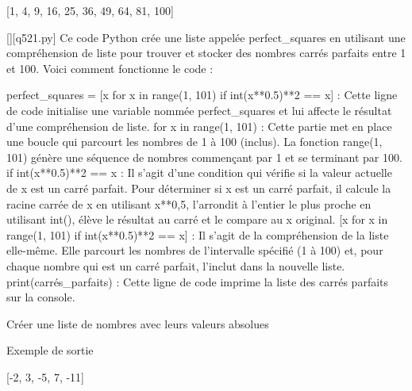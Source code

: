 [1, 4, 9, 16, 25, 36, 49, 64, 81, 100]
        \par
        \begin{solution}
            \renewcommand{\nomfichier}{q521.py}
            \pythonfile{\chemincode \nomfichier}[][\nomfichier]
            Ce code Python crée une liste appelée perfect_squares en utilisant une compréhension de liste pour trouver et stocker des nombres carrés parfaits entre 1 et 100. Voici comment fonctionne le code :

    perfect_squares = [x for x in range(1, 101) if int(x**0.5)**2 == x] : Cette ligne de code initialise une variable nommée perfect_squares et lui affecte le résultat d'une compréhension de liste.
        for x in range(1, 101) : Cette partie met en place une boucle qui parcourt les nombres de 1 à 100 (inclus). La fonction range(1, 101) génère une séquence de nombres commençant par 1 et se terminant par 100.
        if int(x**0.5)**2 == x : Il s'agit d'une condition qui vérifie si la valeur actuelle de x est un carré parfait. Pour déterminer si x est un carré parfait, il calcule la racine carrée de x en utilisant x**0,5, l'arrondit à l'entier le plus proche en utilisant int(), élève le résultat au carré et le compare au x original.
        [x for x in range(1, 101) if int(x**0.5)**2 == x] : Il s'agit de la compréhension de la liste elle-même. Elle parcourt les nombres de l'intervalle spécifié (1 à 100) et, pour chaque nombre qui est un carré parfait, l'inclut dans la nouvelle liste.
    print(carrés_parfaits) : Cette ligne de code imprime la liste des carrés parfaits sur la console.
        \end{solution}
        

        \question
        Créer une liste de nombres avec leurs valeurs absolues

Exemple de sortie

[-2, 3, -5, 7, -11]

